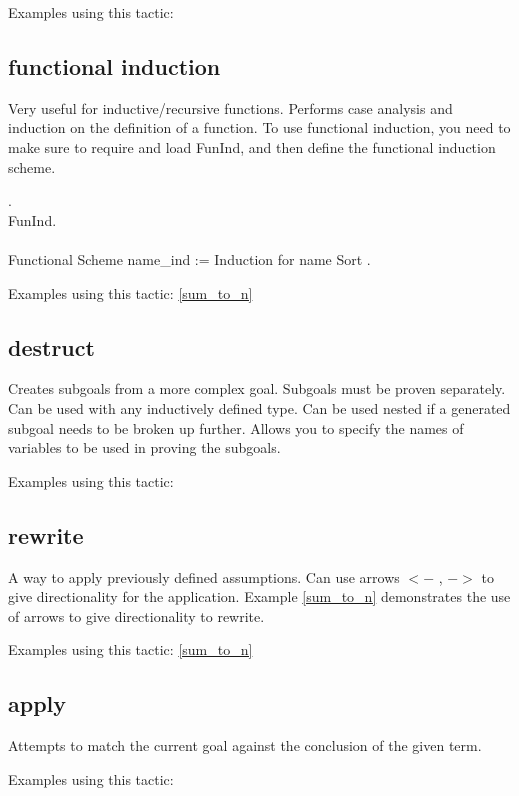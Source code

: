 \noindent
Examples using this tactic: 



\subsection{functional induction} \label{functional induction}
Very useful for inductive/recursive functions.
Performs case analysis and induction on the definition of a function.
To use functional induction, you need to make sure to require and load FunInd, and then define the functional induction scheme.

\begin{code}
 .	\\
\Load FunInd.
\\ \\
Functional Scheme name\_ind := 
  Induction for name Sort .
\end{code}

\noindent
Examples using this tactic: 
\ref{sum_to_n}


\subsection{destruct} \label{destruct}
Creates subgoals from a more complex goal. 
Subgoals must be proven separately.
Can be used with any inductively defined type.
Can be used nested if a generated subgoal needs to be broken up further.
Allows you to specify the names of variables to be used in proving the subgoals.

\noindent
Examples using this tactic: 



\subsection{rewrite} \label{rewrite}
A way to apply previously defined assumptions.
Can use arrows $<-$ , $->$ to give directionality for the application.
Example \ref{sum_to_n} demonstrates the use of arrows to give directionality to rewrite.

\noindent
Examples using this tactic: 
\ref{sum_to_n}


\subsection{apply} \label{apply}
Attempts to match the current goal against the conclusion of the given term.

\noindent
Examples using this tactic:







